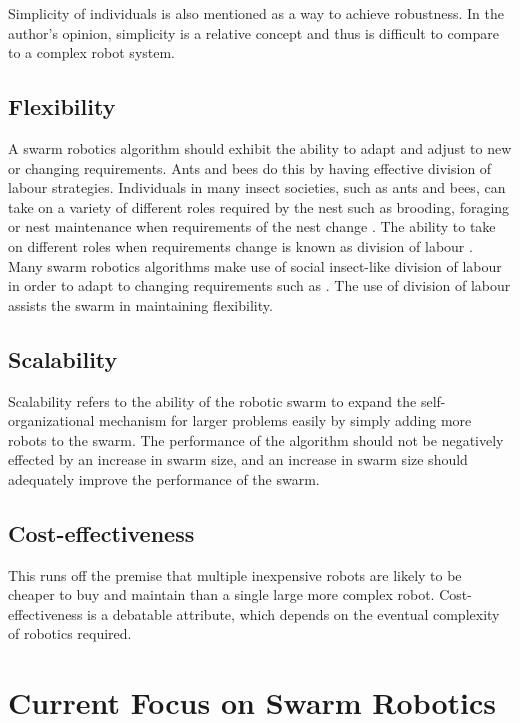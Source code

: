 Simplicity of individuals is also mentioned as a way to achieve robustness. In the author's opinion, simplicity is a relative concept and thus is difficult to compare to a complex robot system. 

\subsection{Flexibility}

A swarm robotics algorithm should exhibit the ability to adapt and adjust to new or changing requirements. Ants and bees do this by having effective division of labour strategies. Individuals in many insect societies, such as ants and bees, can take on a variety of different roles required by the nest such as brooding, foraging or nest maintenance when requirements of the nest change \cite{morley1946division}. The ability to take on different roles when requirements change is known as division of labour \cite{beshers2001models}. Many swarm robotics algorithms make use of social insect-like division of labour in order to adapt to changing requirements such as \cite{labella2006division, liu2007towards, gerkey2004formal}. The use of division of labour assists the swarm in maintaining flexibility.

\subsection{Scalability}
Scalability refers to the ability of the robotic swarm to expand the self-organizational mechanism for larger problems easily by simply adding more robots to the swarm. The performance of the algorithm should not be negatively effected by an increase in swarm size, and an increase in swarm size should adequately improve the performance of the swarm. 

\subsection{Cost-effectiveness}
This runs off the premise that multiple inexpensive robots are likely to be cheaper to buy and maintain than a single large more complex robot. Cost-effectiveness is a debatable attribute, which depends on the eventual complexity of robotics required. 



\section{Current Focus on Swarm Robotics}
%

